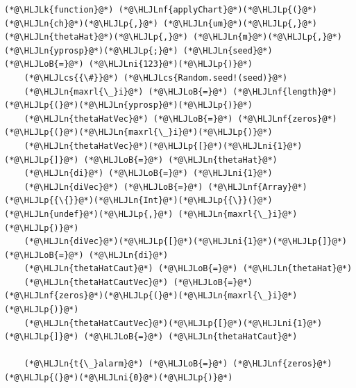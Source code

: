 \documentclass[12pt,a4paper]{article}
\newcommand{\HLJLk}[1]{\textcolor[RGB]{148,91,176}{\textbf{#1}}}
\newcommand{\HLJLn}[1]{#1}
\newcommand{\HLJLnf}[1]{\textcolor[RGB]{66,102,213}{#1}}
\newcommand{\HLJLni}[1]{\textcolor[RGB]{59,151,46}{#1}}
\newcommand{\HLJLoB}[1]{\textcolor[RGB]{102,102,102}{\textbf{#1}}}
\newcommand{\HLJLp}[1]{#1}
\newcommand{\HLJLcs}[1]{\textcolor[RGB]{153,153,119}{\textit{#1}}}
\begin{document}
\begin{lstlisting}
(*@\HLJLk{function}@*) (*@\HLJLnf{applyChart}@*)(*@\HLJLp{(}@*)(*@\HLJLn{ch}@*)(*@\HLJLp{,}@*) (*@\HLJLn{um}@*)(*@\HLJLp{,}@*) (*@\HLJLn{thetaHat}@*)(*@\HLJLp{,}@*) (*@\HLJLn{m}@*)(*@\HLJLp{,}@*) (*@\HLJLn{yprosp}@*)(*@\HLJLp{;}@*) (*@\HLJLn{seed}@*) (*@\HLJLoB{=}@*) (*@\HLJLni{123}@*)(*@\HLJLp{)}@*)
    (*@\HLJLcs{{\#}}@*) (*@\HLJLcs{Random.seed!(seed)}@*)
    (*@\HLJLn{maxrl{\_}i}@*) (*@\HLJLoB{=}@*) (*@\HLJLnf{length}@*)(*@\HLJLp{(}@*)(*@\HLJLn{yprosp}@*)(*@\HLJLp{)}@*)
    (*@\HLJLn{thetaHatVec}@*) (*@\HLJLoB{=}@*) (*@\HLJLnf{zeros}@*)(*@\HLJLp{(}@*)(*@\HLJLn{maxrl{\_}i}@*)(*@\HLJLp{)}@*)
    (*@\HLJLn{thetaHatVec}@*)(*@\HLJLp{[}@*)(*@\HLJLni{1}@*)(*@\HLJLp{]}@*) (*@\HLJLoB{=}@*) (*@\HLJLn{thetaHat}@*)
    (*@\HLJLn{di}@*) (*@\HLJLoB{=}@*) (*@\HLJLni{1}@*)
    (*@\HLJLn{diVec}@*) (*@\HLJLoB{=}@*) (*@\HLJLnf{Array}@*)(*@\HLJLp{{\{}}@*)(*@\HLJLn{Int}@*)(*@\HLJLp{{\}}(}@*)(*@\HLJLn{undef}@*)(*@\HLJLp{,}@*) (*@\HLJLn{maxrl{\_}i}@*)(*@\HLJLp{)}@*)
    (*@\HLJLn{diVec}@*)(*@\HLJLp{[}@*)(*@\HLJLni{1}@*)(*@\HLJLp{]}@*) (*@\HLJLoB{=}@*) (*@\HLJLn{di}@*)
    (*@\HLJLn{thetaHatCaut}@*) (*@\HLJLoB{=}@*) (*@\HLJLn{thetaHat}@*)
    (*@\HLJLn{thetaHatCautVec}@*) (*@\HLJLoB{=}@*) (*@\HLJLnf{zeros}@*)(*@\HLJLp{(}@*)(*@\HLJLn{maxrl{\_}i}@*)(*@\HLJLp{)}@*)
    (*@\HLJLn{thetaHatCautVec}@*)(*@\HLJLp{[}@*)(*@\HLJLni{1}@*)(*@\HLJLp{]}@*) (*@\HLJLoB{=}@*) (*@\HLJLn{thetaHatCaut}@*)

    (*@\HLJLn{t{\_}alarm}@*) (*@\HLJLoB{=}@*) (*@\HLJLnf{zeros}@*)(*@\HLJLp{(}@*)(*@\HLJLni{0}@*)(*@\HLJLp{)}@*)


\end{lstlisting}
\end{document}
